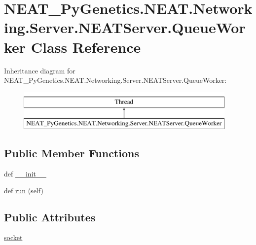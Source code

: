 \hypertarget{classNEAT__PyGenetics_1_1NEAT_1_1Networking_1_1Server_1_1NEATServer_1_1QueueWorker}{}\section{N\+E\+A\+T\+\_\+\+Py\+Genetics.\+N\+E\+A\+T.\+Networking.\+Server.\+N\+E\+A\+T\+Server.\+Queue\+Worker Class Reference}
\label{classNEAT__PyGenetics_1_1NEAT_1_1Networking_1_1Server_1_1NEATServer_1_1QueueWorker}
Inheritance diagram for N\+E\+A\+T\+\_\+\+Py\+Genetics.\+N\+E\+A\+T.\+Networking.\+Server.\+N\+E\+A\+T\+Server.\+Queue\+Worker\+:\begin{figure}[H]
\begin{center}
\leavevmode
\includegraphics[height=2.000000cm]{classNEAT__PyGenetics_1_1NEAT_1_1Networking_1_1Server_1_1NEATServer_1_1QueueWorker}
\end{center}
\end{figure}
\subsection*{Public Member Functions}
\begin{DoxyCompactItemize}
\item 
def \hyperlink{classNEAT__PyGenetics_1_1NEAT_1_1Networking_1_1Server_1_1NEATServer_1_1QueueWorker_a413e2f230b433bfc4f137f1ae1a331e5}{\+\_\+\+\_\+init\+\_\+\+\_\+}
\item 
def \hyperlink{classNEAT__PyGenetics_1_1NEAT_1_1Networking_1_1Server_1_1NEATServer_1_1QueueWorker_a856d13880c0616f9b0c25b02788a54e3}{run} (self)
\end{DoxyCompactItemize}
\subsection*{Public Attributes}
\begin{DoxyCompactItemize}
\item 
\hyperlink{classNEAT__PyGenetics_1_1NEAT_1_1Networking_1_1Server_1_1NEATServer_1_1QueueWorker_ad5eb20f5b3bfb6a6aafa945bd5103c1b}{socket}
\end{DoxyCompactItemize}


